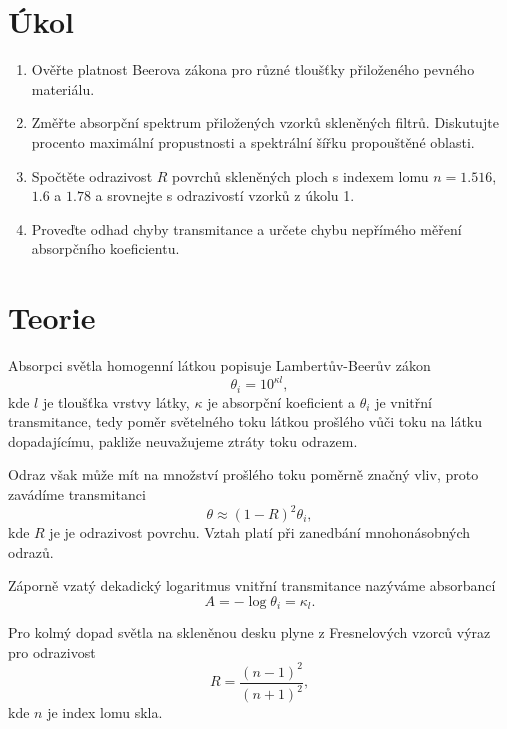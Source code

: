 \documentclass{protokol}
\begin{document}
  \section*{Úkol}

    \begin{enumerate}
      \item Ověřte platnost Beerova zákona pro různé tloušťky přiloženého pevného materiálu.
      \item Změřte absorpční spektrum přiložených vzorků skleněných filtrů. Diskutujte procento maximální propustnosti a spektrální šířku propouštěné oblasti.
      \item Spočtěte odrazivost $R$ povrchů skleněných ploch s indexem lomu $ n = \num{1.516}$, $\num{1.6}$ a $\num{1.78}$ a srovnejte s odrazivostí vzorků z úkolu 1.
      \item Proveďte odhad chyby transmitance a určete chybu nepřímého měření absorpčního koeficientu.
    \end{enumerate}

  \section*{Teorie}

    Absorpci světla homogenní látkou popisuje Lambertův-Beerův zákon
    \begin{equation} \label{eq:theta_i}
      \theta_i = 10^{\kappa l},
    \end{equation}
    kde $l$ je tloušťka vrstvy látky, $\kappa$ je absorpční koeficient a $\theta_i$ je vnitřní transmitance, tedy poměr světelného toku látkou prošlého vůči toku na látku dopadajícímu, pakliže neuvažujeme ztráty toku odrazem.

    Odraz však může mít na množství prošlého toku poměrně značný vliv, proto zavádíme transmitanci
    \begin{equation} \label{eq:theta}
      \theta \approx (1 - R)^2 \theta_i,
    \end{equation}
    kde $R$ je je odrazivost povrchu. Vztah platí při zanedbání mnohonásobných odrazů.

    Záporně vzatý dekadický logaritmus vnitřní transmitance nazýváme absorbancí 
    \begin{equation} \label{eq:A}
      A = - \log \theta_i = \kappa_l.
    \end{equation}

    Pro kolmý dopad světla na skleněnou desku plyne z Fresnelových vzorců výraz pro odrazivost 
    \begin{equation} \label{eq:R}
      R = \frac{(n-1)^2}{(n+1)^2},
    \end{equation}
    kde $n$ je index lomu skla.
  
\end{document}
